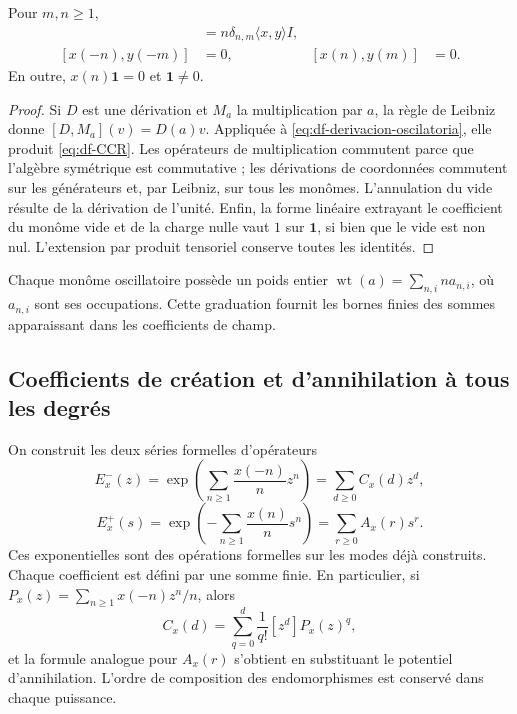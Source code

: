 \begin{theorem}
\label{thm:df-heisenberg}
Pour \(m,n\geq1\),
\begin{align}
 [x(n),y(-m)]&=n\delta_{n,m}\langle x,y\rangle I,
 \label{eq:df-CCR}\\
 [x(-n),y(-m)]&=0,
 & [x(n),y(m)]&=0.
\end{align}
En outre, \(x(n)\mathbf1=0\) et \(\mathbf1\ne0\).
\end{theorem}

\begin{proof}
Si \(D\) est une dérivation et \(M_a\) la multiplication par \(a\), la règle de Leibniz donne \([D,M_a](v)=D(a)v\). Appliquée à \eqref{eq:df-derivacion-oscilatoria}, elle produit \eqref{eq:df-CCR}. Les opérateurs de multiplication commutent parce que l’algèbre symétrique est commutative ; les dérivations de coordonnées commutent sur les générateurs et, par Leibniz, sur tous les monômes. L’annulation du vide résulte de la dérivation de l’unité. Enfin, la forme linéaire extrayant le coefficient du monôme vide et de la charge nulle vaut \(1\) sur \(\mathbf1\), si bien que le vide est non nul. L’extension par produit tensoriel conserve toutes les identités.
\end{proof}

Chaque monôme oscillatoire possède un poids entier \(\operatorname{wt}(a)=\sum_{n,i}n a_{n,i}\), où \(a_{n,i}\) sont ses occupations. Cette graduation fournit les bornes finies des sommes apparaissant dans les coefficients de champ.

\subsection{Coefficients de création et d’annihilation à tous les degrés}
\label{subsec:df-exponenciales}


On construit les deux séries formelles d’opérateurs
\begin{equation}
 E^-_x(z)=\exp\!\left(\sum_{n\geq1}\frac{x(-n)}n z^n\right)
         =\sum_{d\geq0}C_x(d)z^d,
 \label{eq:df-creacion}
\end{equation}
\begin{equation}
 E^+_x(s)=\exp\!\left(-\sum_{n\geq1}\frac{x(n)}n s^n\right)
         =\sum_{r\geq0}A_x(r)s^r.
 \label{eq:df-aniquilacion}
\end{equation}
Ces exponentielles sont des opérations formelles sur les modes déjà construits. Chaque coefficient est défini par une somme finie. En particulier, si \(P_x(z)=\sum_{n\geq1}x(-n)z^n/n\), alors
\begin{equation}
 C_x(d)=\sum_{q=0}^{d}\frac1{q!}[z^d]P_x(z)^q,
 \label{eq:df-coeficiente-creacion}
\end{equation}
et la formule analogue pour \(A_x(r)\) s’obtient en substituant le potentiel d’annihilation. L’ordre de composition des endomorphismes est conservé dans chaque puissance.


